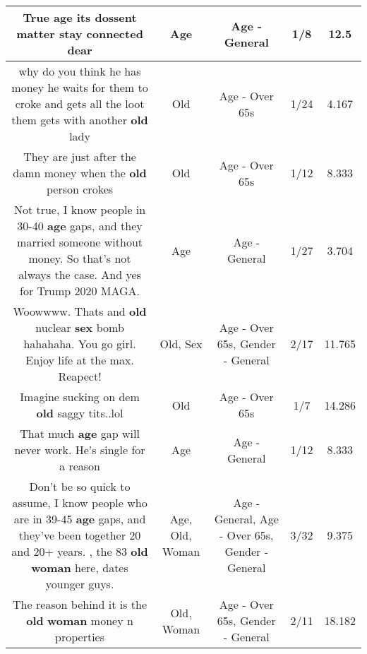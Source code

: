 \documentclass[11pt]{article}
\newlength\mylength
\begin{document}
\begin{center}
\begin{longtable}{|C{.65\mylength}|C{.30\mylength}|C{.12\mylength}|C{.12\mylength}|C{.12\mylength}|}
  \small True \textbf{age} its dossent matter stay connected dear\normalsize   & Age & Age - General & 1/8 & 12.5 \\  \hline
  \small why do you think  he has money he waits for them to croke and gets all the loot them gets with another \textbf{old} lady\normalsize   & Old & Age - Over 65s & 1/24 & 4.167 \\  \hline
  \small They are just after the damn money when the \textbf{old} person crokes\normalsize   & Old & Age - Over 65s & 1/12 & 8.333 \\  \hline
  \small Not true, I know people in 30-40 \textbf{age} gaps,  and they married someone without money. So that's not always the case. And yes for Trump 2020 MAGA.\normalsize   & Age & Age - General & 1/27 & 3.704 \\  \hline
  \small Woowwww. Thats and \textbf{old} nuclear \textbf{sex} bomb hahahaha. You go girl. Enjoy life at the max. Reapect!\normalsize   & Old, Sex & Age - Over 65s, Gender - General & 2/17 & 11.765 \\  \hline
  \small Imagine sucking on dem \textbf{old} saggy tits..lol\normalsize   & Old & Age - Over 65s & 1/7 & 14.286 \\  \hline
  \small That much \textbf{age} gap will never work. He's single for a reason\normalsize   & Age & Age - General & 1/12 & 8.333 \\  \hline
  \small Don't be so quick to assume, I know people who are in 39-45 \textbf{age} gaps, and they've been together 20 and 20+ years. ,  the 83 \textbf{old} \textbf{woman} here,  dates younger guys.\normalsize   & Age, Old, Woman & Age - General, Age - Over 65s, Gender - General & 3/32 & 9.375 \\  \hline
  \small The reason behind it is the \textbf{old} \textbf{woman} money n properties\normalsize   & Old, Woman & Age - Over 65s, Gender - General & 2/11 & 18.182 \\  \hline

\end{longtable}
\end{center}
\end{document}
